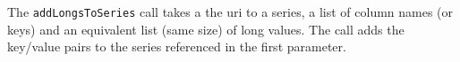 The \verb+addLongsToSeries+ call takes a the uri to a series, a list of column names (or keys) and an equivalent
list (same size) of long values. The call adds the key/value pairs to the series referenced in the first parameter.
